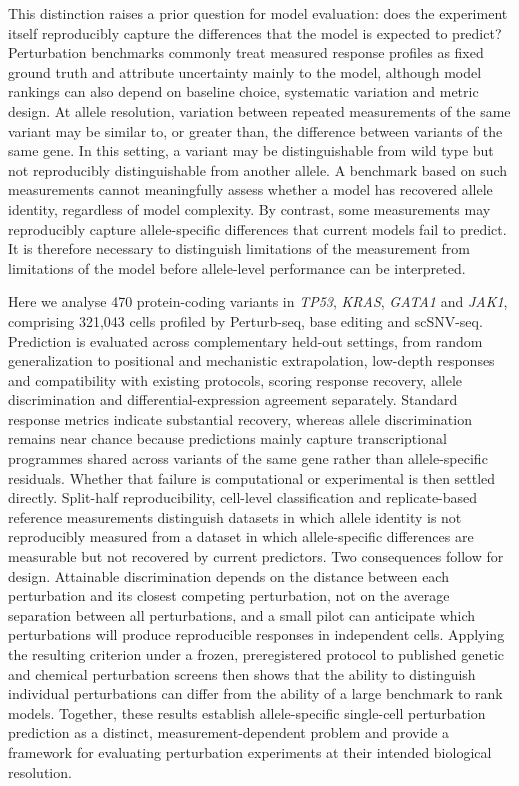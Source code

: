 \documentclass[11pt,letterpaper]{article}
\begin{document}
This distinction raises a prior question for model evaluation: does the experiment itself reproducibly capture the differences that the model is expected to predict? Perturbation benchmarks commonly treat measured response profiles as fixed ground truth and attribute uncertainty mainly to the model, although model rankings can also depend on baseline choice, systematic variation and metric design\cite{AhlmannEltze2025,Systema}. At allele resolution, variation between repeated measurements of the same variant may be similar to, or greater than, the difference between variants of the same gene. In this setting, a variant may be distinguishable from wild type but not reproducibly distinguishable from another allele. A benchmark based on such measurements cannot meaningfully assess whether a model has recovered allele identity, regardless of model complexity. By contrast, some measurements may reproducibly capture allele-specific differences that current models fail to predict. It is therefore necessary to distinguish limitations of the measurement from limitations of the model before allele-level performance can be interpreted.

Here we analyse 470 protein-coding variants in \textit{TP53}, \textit{KRAS}, \textit{GATA1} and \textit{JAK1}, comprising 321,043 cells profiled by Perturb-seq, base editing and scSNV-seq. Prediction is evaluated across complementary held-out settings, from random generalization to positional and mechanistic extrapolation, low-depth responses and compatibility with existing protocols, scoring response recovery, allele discrimination and differential-expression agreement separately. Standard response metrics indicate substantial recovery, whereas allele discrimination remains near chance because predictions mainly capture transcriptional programmes shared across variants of the same gene rather than allele-specific residuals. Whether that failure is computational or experimental is then settled directly. Split-half reproducibility, cell-level classification and replicate-based reference measurements distinguish datasets in which allele identity is not reproducibly measured from a dataset in which allele-specific differences are measurable but not recovered by current predictors. Two consequences follow for design. Attainable discrimination depends on the distance between each perturbation and its closest competing perturbation, not on the average separation between all perturbations, and a small pilot can anticipate which perturbations will produce reproducible responses in independent cells. Applying the resulting criterion under a frozen, preregistered protocol to published genetic and chemical perturbation screens then shows that the ability to distinguish individual perturbations can differ from the ability of a large benchmark to rank models. Together, these results establish allele-specific single-cell perturbation prediction as a distinct, measurement-dependent problem and provide a framework for evaluating perturbation experiments at their intended biological resolution.
\end{document}
